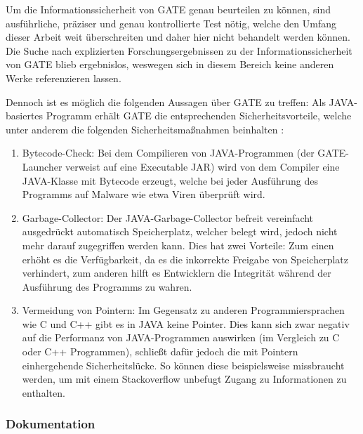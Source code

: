 \documentclass[12pt]{report}
\begin{document}
Um die Informationssicherheit von GATE genau beurteilen zu können, sind ausführliche, präziser und genau kontrollierte Test nötig, welche den Umfang dieser Arbeit weit überschreiten und daher hier nicht behandelt werden können. Die Suche nach explizierten Forschungsergebnissen zu der Informationssicherheit von GATE blieb ergebnislos, weswegen sich in diesem Bereich keine anderen Werke referenzieren lassen.

Dennoch ist es möglich die folgenden Aussagen über GATE zu treffen:
Als JAVA-basiertes Programm erhält GATE die entsprechenden Sicherheitsvorteile, welche unter anderem die folgenden Sicherheitsmaßnahmen beinhalten \cite{do18}:
\begin{enumerate}
\item Bytecode-Check: Bei dem Compilieren von JAVA-Programmen (der GATE-Launcher verweist auf eine Executable JAR) wird von dem Compiler eine JAVA-Klasse mit Bytecode erzeugt, welche bei jeder Ausführung des Programms auf Malware wie etwa Viren überprüft wird. 
\item Garbage-Collector: Der JAVA-Garbage-Collector befreit vereinfacht ausgedrückt automatisch Speicherplatz, welcher belegt wird, jedoch nicht mehr darauf zugegriffen werden kann. Dies hat zwei Vorteile: Zum einen erhöht es die Verfügbarkeit, da es die inkorrekte Freigabe von Speicherplatz verhindert, zum anderen hilft es Entwicklern die Integrität während der Ausführung des Programms zu wahren. 
\item Vermeidung von Pointern: Im Gegensatz zu anderen Programmiersprachen wie C und C++ gibt es in JAVA keine Pointer. Dies kann sich zwar negativ auf die Performanz von JAVA-Programmen auswirken (im Vergleich zu C oder C++ Programmen), schließt dafür jedoch die mit Pointern einhergehende Sicherheitslücke. So können diese beispielsweise missbraucht werden, um mit einem Stackoverflow unbefugt Zugang zu Informationen zu enthalten. 
 
\end{enumerate}

\subsubsection{Dokumentation}
\end{document}
